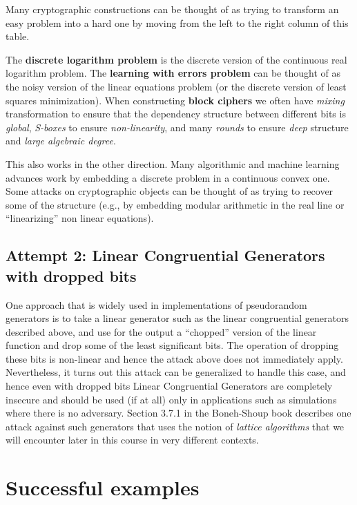 Many cryptographic constructions can be thought of as trying to
transform an easy problem into a hard one by moving from the left to the
right column of this table.

The \textbf{discrete logarithm problem} is the discrete version of the
continuous real logarithm problem. The \textbf{learning with errors
problem} can be thought of as the noisy version of the linear equations
problem (or the discrete version of least squares minimization). When
constructing \textbf{block ciphers} we often have \emph{mixing}
transformation to ensure that the dependency structure between different
bits is \emph{global}, \emph{S-boxes} to ensure \emph{non-linearity},
and many \emph{rounds} to ensure \emph{deep} structure and \emph{large
algebraic degree}.

This also works in the other direction. Many algorithmic and machine
learning advances work by embedding a discrete problem in a continuous
convex one. Some attacks on cryptographic objects can be thought of as
trying to recover some of the structure (e.g., by embedding modular
arithmetic in the real line or ``linearizing'' non linear equations).

\subsection{Attempt 2: Linear Congruential Generators with dropped
bits}\label{3-Attempt--Linear-Congru}

One approach that is widely used in implementations of pseudorandom
generators is to take a linear generator such as the linear congruential
generators described above, and use for the output a ``chopped'' version
of the linear function and drop some of the least significant bits. The
operation of dropping these bits is non-linear and hence the attack
above does not immediately apply. Nevertheless, it turns out this attack
can be generalized to handle this case, and hence even with dropped bits
Linear Congruential Generators are completely insecure and should be
used (if at all) only in applications such as simulations where there is
no adversary. Section 3.7.1 in the Boneh-Shoup book describes one attack
against such generators that uses the notion of \emph{lattice
algorithms} that we will encounter later in this course in very
different contexts.

\section{Successful examples}\label{3-Successful-examples}

